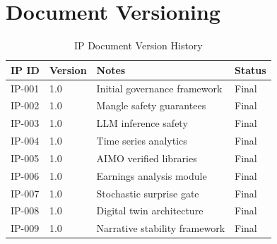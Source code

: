 \section{Document Versioning}

\begin{table}[H]
\centering
\caption{IP Document Version History}
\begin{tabularx}{\textwidth}{@{}llXl@{}}
\toprule
\textbf{IP ID} & \textbf{Version} & \textbf{Notes} & \textbf{Status} \\
\midrule
IP-001 & 1.0 & Initial governance framework & Final \\
IP-002 & 1.0 & Mangle safety guarantees & Final \\
IP-003 & 1.0 & LLM inference safety & Final \\
IP-004 & 1.0 & Time series analytics & Final \\
IP-005 & 1.0 & AIMO verified libraries & Final \\
IP-006 & 1.0 & Earnings analysis module & Final \\
IP-007 & 1.0 & Stochastic surprise gate & Final \\
IP-008 & 1.0 & Digital twin architecture & Final \\
IP-009 & 1.0 & Narrative stability framework & Final \\
\bottomrule
\end{tabularx}
\end{table}